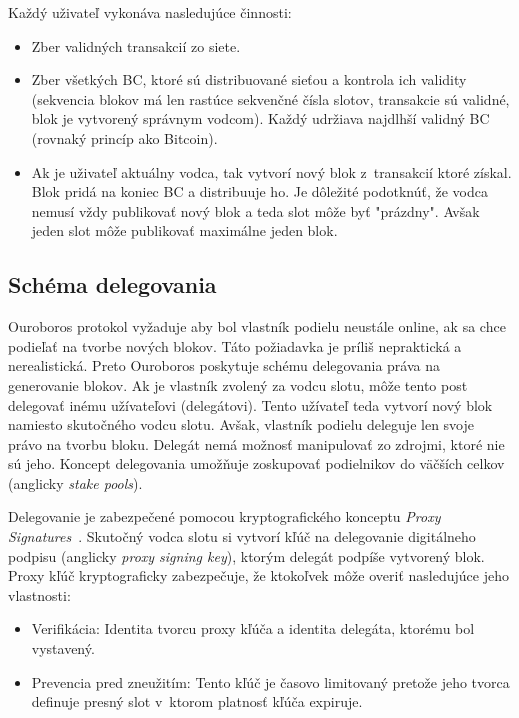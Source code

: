 Každý uživateľ vykonáva nasledujúce činnosti:
\begin{itemize}
	\item Zber validných transakcií zo siete.
	\item Zber všetkých BC, ktoré sú distribuované sieťou a kontrola ich validity (sekvencia blokov má len rastúce sekvenčné čísla slotov, transakcie sú validné, blok je vytvorený správnym vodcom). Každý udržiava najdlhší validný BC (rovnaký princíp ako Bitcoin).
	\item Ak je uživateľ aktuálny vodca, tak vytvorí nový blok z~transakcií ktoré získal. Blok pridá na koniec BC a distribuuje ho. Je dôležité podotknúť, že vodca nemusí vždy publikovať nový blok a teda slot môže byť "prázdny". Avšak jeden slot môže publikovať maximálne jeden blok.
\end{itemize}

\subsection{Schéma delegovania}\label{subsec:ourobors-delegation}
Ouroboros protokol vyžaduje aby bol vlastník podielu neustále online, ak sa chce podieľať na tvorbe nových blokov. Táto požiadavka je príliš nepraktická a nerealistická. Preto Ouroboros poskytuje schému delegovania práva na generovanie blokov. Ak je vlastník zvolený za vodcu slotu, môže tento post delegovať inému užívateľovi (delegátovi). Tento užívateľ teda vytvorí nový blok namiesto skutočného vodcu slotu. Avšak, vlastník podielu deleguje len svoje právo na tvorbu bloku. Delegát nemá možnosť manipulovať zo zdrojmi, ktoré nie sú jeho. Koncept delegovania umožňuje zoskupovať podielnikov do väčších celkov (anglicky \textit{stake pools}). 

Delegovanie je zabezpečené pomocou kryptografického konceptu \textit{Proxy Signatures}~\cite{proxySig}. Skutočný vodca slotu si vytvorí kľúč na delegovanie digitálneho podpisu (anglicky \textit{proxy signing key}), ktorým delegát podpíše vytvorený blok. Proxy kľúč kryptograficky zabezpečuje, že ktokoľvek môže overiť nasledujúce jeho vlastnosti:
\begin{itemize}
	\item Verifikácia: Identita tvorcu proxy kľúča a identita delegáta, ktorému bol vystavený.
	\item Prevencia pred zneužitím: Tento kľúč je časovo limitovaný pretože jeho tvorca definuje presný slot v~ktorom platnosť kľúča expiruje. 
\end{itemize}

